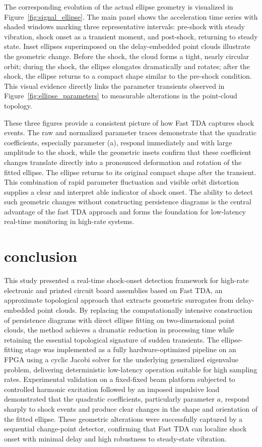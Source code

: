 \documentclass[colorlinks,upint,subscriptcorrection,varvw,hyphenate,balance,greek,russian,vietnamese,german]{asmeconf} %
\begin{document}
The corresponding evolution of the actual ellipse geometry is visualized in Figure~\ref{fig:signal_ellipse}. The main panel shows the acceleration time series with shaded windows marking three representative intervals: pre-shock with steady vibration, shock onset as a transient moment, and post-shock, returning to steady state. Inset ellipses superimposed on the delay-embedded point clouds illustrate the geometric change. Before the shock, the cloud forms a tight, nearly circular orbit; during the shock, the ellipse elongates dramatically and rotates; after the shock, the ellipse returns to a compact shape similar to the pre-shock condition. This visual evidence directly links the parameter transients observed in Figure~\ref{fig:ellipse_parameters} to measurable alterations in the point-cloud topology.

These three figures provide a consistent picture of how Fast TDA captures shock events. The raw and normalized parameter traces demonstrate that the quadratic coefficients, especially parameter (a), respond immediately and with large amplitude to the shock, while the geometric insets confirm that these coefficient changes translate directly into a pronounced deformation and rotation of the fitted ellipse. The ellipse returns to its original compact shape after the transient. This combination of rapid parameter fluctuation and visible orbit distortion supplies a clear and interpret able indicator of shock onset. The ability to detect such geometric changes without constructing persistence diagrams is the central advantage of the fast TDA approach and forms the foundation for low-latency real-time monitoring in high-rate systems.




\section{conclusion}


This study presented a real-time shock-onset detection framework for high-rate electronic and printed circuit board assemblies based on Fast TDA, an approximate topological approach that extracts geometric surrogates from delay-embedded point clouds. By replacing the computationally intensive construction of persistence diagrams with direct ellipse fitting on two-dimensional point clouds, the method achieves a dramatic reduction in processing time while retaining the essential topological signature of sudden transients. The ellipse-fitting stage was implemented as a fully hardware-optimized pipeline on an FPGA using a cyclic Jacobi solver for the underlying generalized eigenvalue problem, delivering deterministic low-latency operation suitable for high sampling rates. Experimental validation on a fixed-fixed beam platform subjected to controlled harmonic excitation followed by an imposed impulsive load demonstrated that the quadratic coefficients, particularly parameter \(a\), respond sharply to shock events and produce clear changes in the shape and orientation of the fitted ellipse. These geometric alterations were successfully captured by a sequential change-point detector, confirming that Fast TDA can localize shock onset with minimal delay and high robustness to steady-state vibration.
\end{document}

